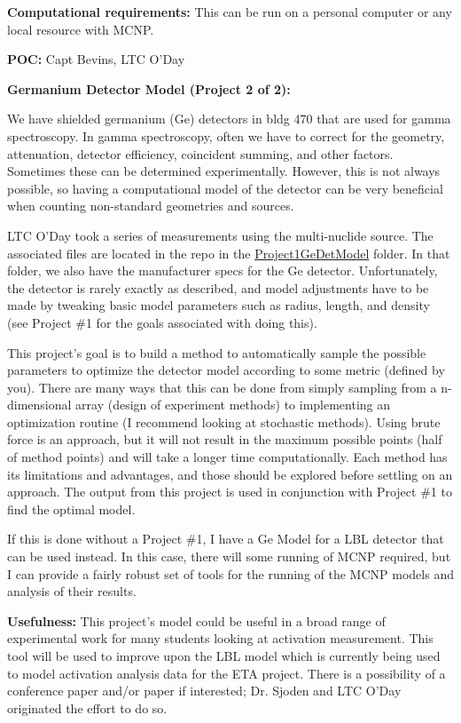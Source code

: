 \documentclass[12pt, answers]{exam}
\begin{document}
\begin{questions}
\textbf{Computational requirements:}
This can be run on a personal computer or any local resource with MCNP.

\textbf{POC:} Capt Bevins, LTC O'Day
  
\newpage
 

\question \textbf{Germanium Detector Model (Project 2 of 2):}

We have shielded germanium (Ge) detectors in bldg 470 that are used for gamma spectroscopy.  
In gamma spectroscopy, often we have to correct for the geometry, attenuation, detector efficiency, coincident summing, and other factors.  
Sometimes these can be determined experimentally.  
However, this is not always possible, so having a computational model of the detector can be very beneficial when counting non-standard geometries and sources.

LTC O'Day took a series of measurements using the multi-nuclide source.  
The associated files are located in the repo in the \href{https://github.com/jamesbevins/NENG685/Projects/Project1_GeDetModel}{Project1\textunderscore GeDetModel} folder. 
In that folder, we also have the manufacturer specs for the Ge detector.
Unfortunately, the detector is rarely exactly as described, and model adjustments have to be made by tweaking basic model parameters such as radius, length, and density (see Project \#1 for the goals associated with doing this).

This project's goal is to build a method to automatically sample the possible parameters to optimize the detector model according to some metric (defined by you).  
There are many ways that this can be done from simply sampling from a n-dimensional array (design of experiment methods) to implementing an optimization routine (I recommend looking at stochastic methods).
Using brute force is an approach, but it will not result in the maximum possible points (half of method points) and will take a longer time computationally.  
Each method has its limitations and advantages, and those should be explored before settling on an approach. 
The output from this project is used in conjunction with Project \#1 to find the optimal model.  

If this is done without a Project \#1, I have a Ge Model for a LBL detector that can be used instead.
In this case, there will some running of MCNP required, but I can provide a fairly robust set of tools for the running of the MCNP models and analysis of their results.

\textbf{Usefulness:} 
This project's model could be useful in a broad range of experimental work for many students looking at activation measurement.  
This tool will be used to improve upon the LBL model which is currently being used to model activation analysis data for the ETA project.
There is a possibility of a conference paper and/or paper if interested; Dr. Sjoden and LTC O'Day originated the effort to do so.


\end{questions}
\end{document}
